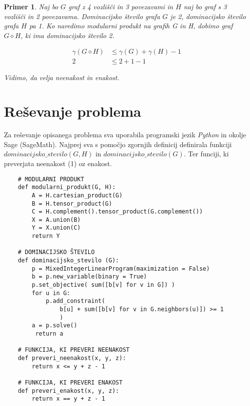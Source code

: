 \documentclass[a4paper,12pt]{article}
\newtheorem{primer}{Primer}
\begin{document}
\begin{primer}
    Naj bo $G$ graf z 4 vozlišči in 3 povezavami in $H$ naj bo graf s 3 vozlišči in 
    2 povezavama. Dominacijsko število grafa $G$ je 2, dominacijsko število grafa $H$ pa 1. Ko naredimo modularni produkt na grafih G in H, 
    dobimo graf $G \diamond H$, ki ima dominacijsko število 2. 

    \begin{align*} 
        \gamma(G\diamond H) &\leq \gamma (G) + \gamma (H) - 1 \\ 
        2 &\leq 2 + 1 - 1
    \end{align*}
    
    Vidimo, da velja neenakost in enakost.

\end{primer}

\section{Reševanje problema}
Za reševanje opisanega problema sva uporabila programski jezik \emph{Python} in okolje Sage (SageMath).
Najprej sva s pomočjo zgornjih definicij definirala funkciji $dominacijsko\_stevilo(G, H)$ in $dominacijsko\_stevilo(G)$.
Ter funciji, ki preverjata neenakost (1) oz enakost.

\begin{verbatim}
    # MODULARNI PRODUKT
    def modularni_produkt(G, H):
        A = H.cartesian_product(G)
        B = H.tensor_product(G)
        C = H.complement().tensor_product(G.complement())
        X = A.union(B)
        Y = X.union(C)
        return Y
    
    # DOMINACIJSKO ŠTEVILO
    def dominacijsko_stevilo (G):
        p = MixedIntegerLinearProgram(maximization = False)
        b = p.new_variable(binary = True)
        p.set_objective( sum([b[v] for v in G]) )
        for u in G:
            p.add_constraint( 
                b[u] + sum([b[v] for v in G.neighbors(u)]) >= 1 
                )
        a = p.solve()
         return a

    # FUNKCIJA, KI PREVERI NEENAKOST
    def preveri_neenakost(x, y, z):
        return x <= y + z - 1

    # FUNKCIJA, KI PREVERI ENAKOST 
    def preveri_enakost(x, y, z):
        return x == y + z - 1
\end{verbatim}
\end{document}
